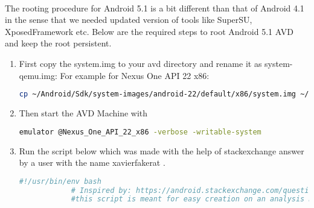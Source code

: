 \documentclass[../main.tex]{subfile}
\begin{document}
		\paragraph{} The rooting procedure for Android 5.1 is a bit different than that of Android 4.1 in the sense that we needed updated version of tools like SuperSU, XposedFramework etc. Below are the required steps to root Android 5.1 AVD and keep the root persistent.
		\begin{enumerate}
			\item First copy the system.img to your avd directory and rename it as system-qemu.img: For example for Nexus One API 22 x86: \newline 
			\begin{lstlisting}[language=bash, numbers=none]
			cp ~/Android/Sdk/system-images/android-22/default/x86/system.img ~/.android/avd/Nexus_One_API_22_x86.avd/system-qemu.img
			\end{lstlisting}
						
			
			\item Then start the AVD Machine with \newline 
			\begin{lstlisting}[language=bash, numbers=none]
			emulator @Nexus_One_API_22_x86 -verbose -writable-system
			\end{lstlisting}
						
			
			\item Run the script below which was made with the help of stackexchange answer by a user with the name xavier\textunderscore fakerat \cite{android_emulator_7.1_root_stackexchange}.
			\begin{lstlisting}[language=bash]
			#!/usr/bin/env bash
			# Inspired by: https://android.stackexchange.com/questions/171442/root-android-virtual-device-with-android-7-1-1/176447
			#this script is meant for easy creation on an analysis machine for android emulator avd
			

\end{lstlisting}
\end{enumerate}
\end{document}
